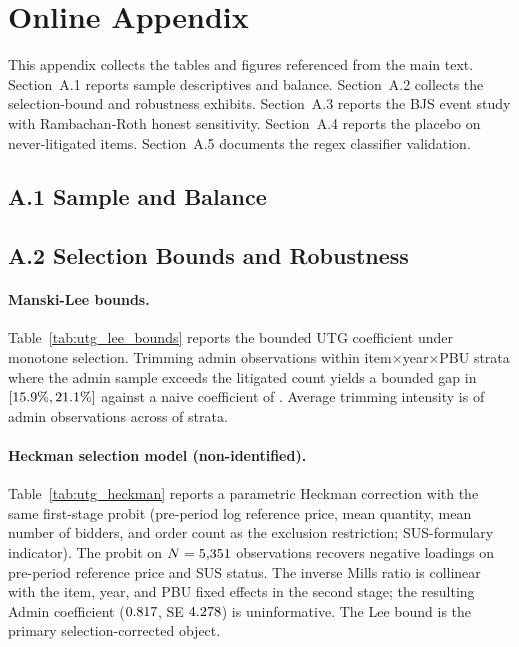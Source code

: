 \setcounter{table}{0}
\setcounter{figure}{0}

\section*{Online Appendix}
\label{sec:appendix}

This appendix collects the tables and figures referenced from the main
text. Section~A.1 reports sample descriptives and balance.
Section~A.2 collects the selection-bound and robustness exhibits.
Section~A.3 reports the BJS event study with Rambachan-Roth honest
sensitivity. Section~A.4 reports the placebo on never-litigated items.
Section~A.5 documents the regex classifier validation.

\subsection*{A.1 Sample and Balance}


\subsection*{A.2 Selection Bounds and Robustness}

\paragraph{Manski-Lee bounds.}
Table~\ref{tab:utg_lee_bounds} reports the bounded UTG coefficient
under monotone selection. Trimming admin observations within
item$\times$year$\times$PBU strata where the admin sample exceeds the
litigated count yields a bounded gap in
$[15.9\%, 21.1\%]$ against a naive coefficient of
\BPutgPointNaive. Average trimming intensity is \BPutgLeeTrimMean{}
of admin observations across \BPutgLeeStrataExcess{} of
\BPutgLeeStrataTotal{} strata.



\paragraph{Heckman selection model (non-identified).}
Table~\ref{tab:utg_heckman} reports a parametric Heckman correction
with the same first-stage probit (pre-period log reference price,
mean quantity, mean number of bidders, and order count as the
exclusion restriction; SUS-formulary indicator). The probit on
$N=5{,}351$ observations recovers negative loadings on
pre-period reference price and SUS status. The inverse Mills ratio
is collinear with the item, year, and PBU fixed effects in the
second stage; the resulting Admin coefficient ($0.817$,
SE $4.278$) is uninformative. The Lee bound is the
primary selection-corrected object.

